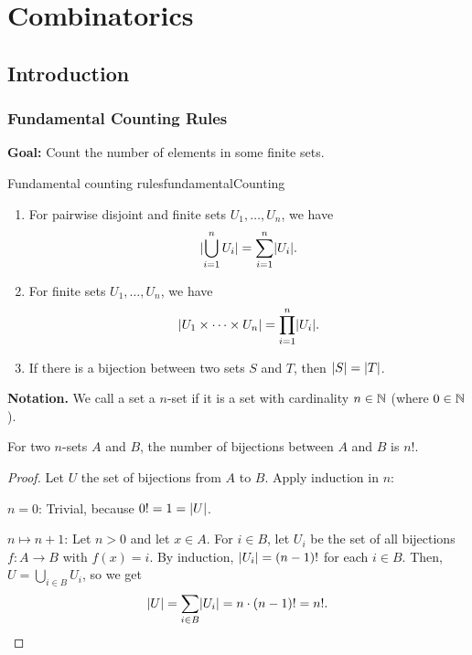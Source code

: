 \documentclass[language=english]{../../Template/TemplateLecture}
\begin{document}
\setcounter{chapter}{0}



\part{Combinatorics}

\chapter{Introduction}
\section{Fundamental Counting Rules}

\textbf{Goal:} Count the number of elements in some finite sets.

\begin{lem}{Fundamental counting rules}{fundamentalCounting}
    \begin{enumerate}[$(i)$]
        \item For pairwise disjoint and finite sets $U_1, \ldots, U_n$, we have
        \begin{equation}
            \lvert\bigcup_{i = 1}^n U_i\rvert = \sum_{i = 1}^n \lvert U_i\rvert.
        \end{equation}
        \item For finite sets $U_1, \ldots, U_n$, we have
        \begin{equation}
            \lvert U_1 \times \cdots \times U_n\rvert = \prod_{i = 1}^n \lvert U_i\rvert.
        \end{equation}
        \item If there is a bijection between two sets $S$ and $T$, then $\lvert S\rvert = \lvert T\rvert$.
    \end{enumerate}
\end{lem}

\textbf{Notation.} We call a set a $n$-set if it is a set with cardinality $n \in \mathbb{N}$ (where $0 \in \mathbb{N}$).

\begin{prop}
    For two $n$-sets $A$ and $B$, the number of bijections between $A$ and $B$ is $n!$.
\end{prop}
\begin{proof}
    Let $U$ the set of bijections from $A$ to $B$. Apply induction in $n$:

    $n = 0$: Trivial, because $0! = 1 = \lvert U\rvert$.

    $n \mapsto n + 1$: Let $n > 0$ and let $x \in A$. For $i \in B$, let $U_i$ be the set of all bijections $f: A \to B$ with $f(x) = i$. By induction, $\lvert U_i\rvert = (n-1)!$ for each $i \in B$. Then, $U = \bigcup_{i \in B} U_i$, so we get 
    \begin{equation}
        \lvert U\rvert = \sum_{i \in B} \lvert U_i\rvert = n\cdot (n-1)! = n!.
    \end{equation}
\end{proof}
\end{document}

